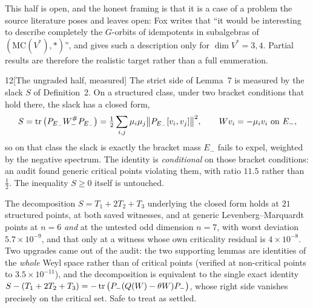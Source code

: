 This half is open, and the honest framing is that it is a case of a problem the source literature poses and leaves open: Fox writes that ``it would be interesting to describe completely the $G$-orbits of idempotents in subalgebras of $(\mathrm{MC}(V^{*}),*)$'', and gives such a description only for $\dim V^{*}=3,4$. Partial results are therefore the realistic target rather than a full enumeration.

\begin{Obs}{12}[The ungraded half, measured]
The strict side of Lemma~7 is measured by the slack $S$ of Definition~2. On a structured class, under two bracket conditions that hold there, the slack has a closed form,
\[
S=\operatorname{tr}\big(P_{E_-}W_-^{\#}P_{E_-}\big)=\tfrac12\sum_{i,j}\mu_i\mu_j\big\|P_{E_-}[v_i,v_j]\big\|^2,\qquad Wv_i=-\mu_iv_i \text{ on } E_-,
\]
so on that class the slack is exactly the bracket mass $E_-$ fails to expel, weighted by the negative spectrum. The identity is \emph{conditional} on those bracket conditions: an audit found generic critical points violating them, with ratio $11.5$ rather than $\tfrac12$. The inequality $S\ge0$ itself is untouched.
\end{Obs}

\begin{certificate}
The decomposition $S=T_1+2T_2+T_3$ underlying the closed form holds at $21$ structured points, at both saved witnesses, and at generic Levenberg--Marquardt points at $n=6$ \emph{and} at the untested odd dimension $n=7$, with worst deviation $5.7\times10^{-9}$, and that only at a witness whose own criticality residual is $4\times10^{-8}$. Two upgrades came out of the audit: the two supporting lemmas are identities of the \emph{whole} Weyl space rather than of critical points (verified at non-critical points to $3.5\times10^{-11}$), and the decomposition is equivalent to the single exact identity $S-(T_1+2T_2+T_3)=-\operatorname{tr}\big(P_-(Q(W)-\theta W)P_-\big)$, whose right side vanishes precisely on the critical set. Safe to treat as settled.
\end{certificate}

